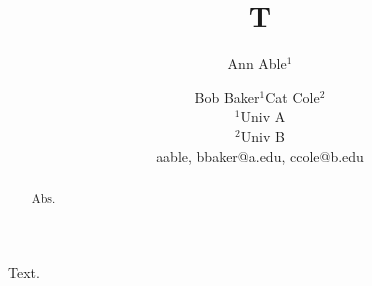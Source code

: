\documentclass{article}
\title{T}
\author{Ann Able$^1$\and Bob Baker$^1$\And Cat Cole$^2$\\
\affiliations
$^1$Univ A\\
$^2$Univ B\\
\emails
{aable, bbaker}@a.edu,
ccole@b.edu
}
\begin{document}
\maketitle
\begin{abstract}Abs.\end{abstract}
Text.
\end{document}
